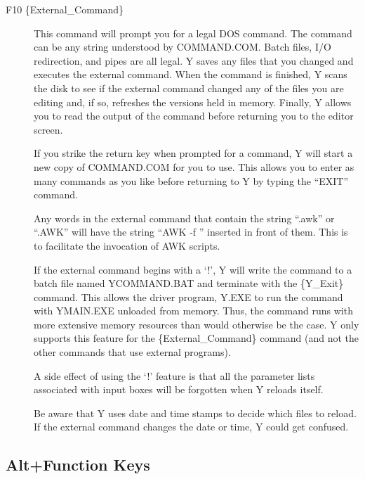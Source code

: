 \begin{description}
\item[F10 \{External\_Command\}] This command will prompt you for a legal DOS command. The
  command can be any string understood by COMMAND.COM. Batch files, I/O redirection, and pipes
  are all legal. Y saves any files that you changed and executes the external command. When the
  command is finished, Y scans the disk to see if the external command changed any of the files
  you are editing and, if so, refreshes the versions held in memory. Finally, Y allows you to
  read the output of the command before returning you to the editor screen.

  If you strike the return key when prompted for a command, Y will start a new copy of
  COMMAND.COM for you to use. This allows you to enter as many commands as you like before
  returning to Y by typing the ``EXIT'' command.

  Any words in the external command that contain the string ``.awk'' or ``.AWK'' will have the
  string ``AWK -f '' inserted in front of them. This is to facilitate the invocation of AWK
  scripts.

  If the external command begins with a `!', Y will write the command to a batch file named
  YCOMMAND.BAT and terminate with the \{Y\_Exit\} command. This allows the driver program, Y.EXE
  to run the command with YMAIN.EXE unloaded from memory. Thus, the command runs with more
  extensive memory resources than would otherwise be the case. Y only supports this feature for
  the \{External\_Command\} command (and not the other commands that use external programs).

  A side effect of using the `!' feature is that all the parameter lists associated with input
  boxes will be forgotten when Y reloads itself.

  Be aware that Y uses date and time stamps to decide which files to reload. If the external
  command changes the date or time, Y could get confused.

\end{description}

\subsection{Alt+Function Keys}

